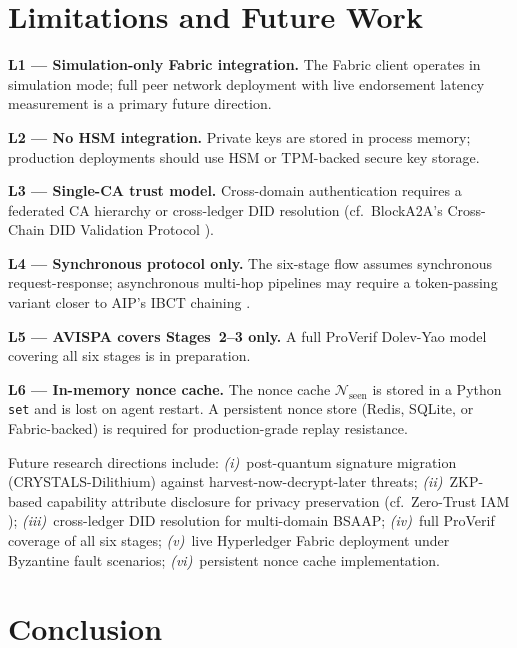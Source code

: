 \documentclass[review,5p,twocolumn,times]{elsarticle}
\begin{document}
\section{Limitations and Future Work}\label{sec:limits}

\textbf{L1 --- Simulation-only Fabric integration.} The Fabric client operates
in simulation mode; full peer network deployment with live endorsement latency
measurement is a primary future direction.

\textbf{L2 --- No HSM integration.} Private keys are stored in process memory;
production deployments should use HSM or TPM-backed secure key storage.

\textbf{L3 --- Single-CA trust model.} Cross-domain authentication requires a
federated CA hierarchy or cross-ledger DID resolution (cf.\
BlockA2A's Cross-Chain DID Validation Protocol \cite{blocka2a2025}).

\textbf{L4 --- Synchronous protocol only.} The six-stage flow assumes
synchronous request-response; asynchronous multi-hop pipelines may require
a token-passing variant closer to AIP's IBCT chaining \cite{aip2026}.

\textbf{L5 --- AVISPA covers Stages~2--3 only.} A full ProVerif Dolev-Yao
model \cite{blanchet2016proverif} covering all six stages is in preparation.

\textbf{L6 --- In-memory nonce cache.} The nonce cache
$\mathcal{N}_{\mathrm{seen}}$ is stored in a Python \texttt{set} and is
lost on agent restart. A persistent nonce store (Redis, SQLite, or
Fabric-backed) is required for production-grade replay resistance.

Future research directions include: \emph{(i)}~post-quantum signature
migration (CRYSTALS-Dilithium) against harvest-now-decrypt-later threats;
\emph{(ii)}~ZKP-based capability attribute disclosure for privacy preservation
(cf.\ Zero-Trust IAM \cite{zerotrust2025}); \emph{(iii)}~cross-ledger
DID resolution for multi-domain BSAAP; \emph{(iv)}~full ProVerif coverage
of all six stages; \emph{(v)}~live Hyperledger Fabric deployment under
Byzantine fault scenarios; \emph{(vi)}~persistent nonce cache implementation.

\section{Conclusion}\label{sec:conclusion}
\end{document}
